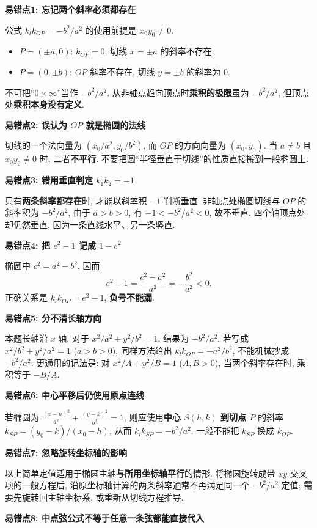 \begin{trapbox}
\textbf{易错点1: 忘记两个斜率必须都存在}

公式 $k_lk_{OP}=-b^2/a^2$ 的使用前提是 $x_0y_0\ne0$.
\begin{itemize}
  \item $P=(\pm a,0)$: $k_{OP}=0$, 切线 $x=\pm a$ 的斜率不存在.
  \item $P=(0,\pm b)$: $OP$ 斜率不存在, 切线 $y=\pm b$ 的斜率为 $0$.
\end{itemize}
不可把“$0\times\infty$”当作 $-b^2/a^2$.
从非轴点趋向顶点时\textbf{乘积的极限}虽为 $-b^2/a^2$,
但顶点处\textbf{乘积本身没有定义}.

\textbf{易错点2: 误认为 $OP$ 就是椭圆的法线}

切线的一个法向量为
$\left(x_0/a^2,y_0/b^2\right)$, 而 $OP$ 的方向向量为 $(x_0,y_0)$.
当 $a\ne b$ 且 $x_0y_0\ne0$ 时, 二者\textbf{不平行}.
不要把圆“半径垂直于切线”的性质直接搬到一般椭圆上.

\textbf{易错点3: 错用垂直判定 $k_1k_2=-1$}

只有\textbf{两条斜率都存在}时, 才能以斜率积 $-1$ 判断垂直.
非轴点处椭圆切线与 $OP$ 的斜率积为 $-b^2/a^2$,
由于 $a>b>0$, 有 $-1<-b^2/a^2<0$, 故不垂直.
四个轴顶点处却仍然垂直, 因为一条直线水平、另一条竖直.

\textbf{易错点4: 把 $e^2-1$ 记成 $1-e^2$}

椭圆中 $c^2=a^2-b^2$, 因而
\[
e^2-1=\frac{c^2-a^2}{a^2}=-\frac{b^2}{a^2}<0.
\]
正确关系是 $k_lk_{OP}=e^2-1$, \textbf{负号不能漏}.

\textbf{易错点5: 分不清长轴方向}

本题长轴沿 $x$ 轴, 对于 $x^2/a^2+y^2/b^2=1$,
结果为 $-b^2/a^2$.
若写成 $x^2/b^2+y^2/a^2=1$ ($a>b>0$),
同样方法给出 $k_lk_{OP}=-a^2/b^2$, 不能机械抄成 $-b^2/a^2$.
更通用的记法是: 对 $x^2/A+y^2/B=1$ ($A,B>0$),
当两个斜率存在时, 乘积等于 $-B/A$.

\textbf{易错点6: 中心平移后仍使用原点连线}

若椭圆为
$\frac{(x-h)^2}{a^2}+\frac{(y-k)^2}{b^2}=1$,
则应使用\textbf{中心 $S(h,k)$ 到切点 $P$} 的斜率
$k_{SP}=(y_0-k)/(x_0-h)$, 从而 $k_lk_{SP}=-b^2/a^2$.
一般不能把 $k_{SP}$ 换成 $k_{OP}$.

\textbf{易错点7: 忽略旋转坐标轴的影响}

以上简单定值适用于椭圆主轴\textbf{与所用坐标轴平行}的情形.
将椭圆旋转成带 $xy$ 交叉项的一般方程后,
沿原坐标轴计算的两条斜率通常不再满足同一个 $-b^2/a^2$ 定值;
需要先旋转回主轴坐标系, 或重新从切线方程推导.

\textbf{易错点8: 中点弦公式不等于任意一条弦都能直接代入}


\end{trapbox}
